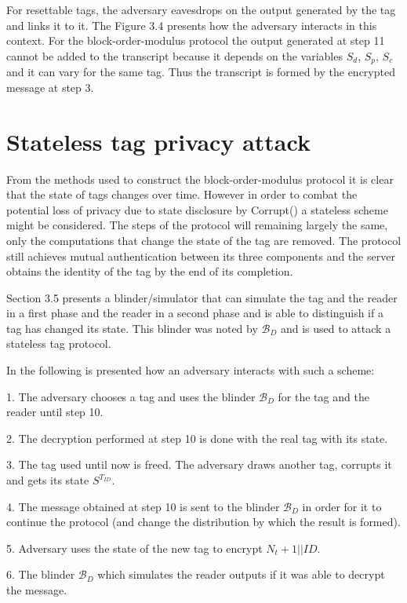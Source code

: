     For resettable tags, the adversary eavesdrops on the output generated by the tag and links it to it. The Figure 3.4 presents how the adversary
    interacts in this context. For the block-order-modulus protocol the output generated at step 11 cannot be added to the transcript because it
    depends on the variables $S_d$, $S_p$, $S_c$ and it can vary for the same tag. Thus the transcript is formed by the encrypted message at step 3.
    
\section{Stateless tag privacy attack}
    From the methods used to construct the block-order-modulus protocol it is clear that the state of tags changes over time. However in order to combat
    the potential loss of privacy due to state disclosure by Corrupt() a stateless scheme might be considered. The steps of the protocol will remaining
    largely the same, only the computations that change the state of the tag are removed. The protocol still achieves mutual authentication between its 
    three components and the server obtains the identity of the tag by the end of its completion. 
    
    Section 3.5 presents a blinder/simulator that can simulate the tag and the reader in a first phase and the reader in a second phase and
    is able to distinguish if a tag has changed its state. This blinder was noted by $\mathcal{B}_D$ and is used
    to attack a stateless tag protocol.
    
    In the following is presented how an adversary interacts with such a scheme:

    1. The adversary chooses a tag and uses the blinder $\mathcal{B}_D$ for the tag and the reader until step 10.

    2. The decryption performed at step 10 is done with the real tag with its state. 

    3. The tag used until now is freed. The adversary draws another tag, corrupts it and gets its state $S^{T_{ID}}$.

    4. The message obtained at step 10 is sent to the blinder $\mathcal{B}_D$ in order for it to continue the protocol (and change the
    distribution by which the result is formed).

    5. Adversary uses the state of the new tag to encrypt $N_t+1||ID$.

    6. The blinder $\mathcal{B}_D$ which simulates the reader outputs if it was able to decrypt the message.


